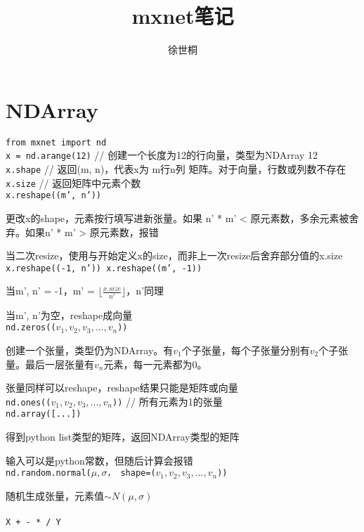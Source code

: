 \documentclass[UTF8]{ctexart}
\title{mxnet笔记}
\author{徐世桐}
\date{}
\begin{document}
\maketitle

\section{NDArray}

\noindent \texttt{from mxnet import nd}\\
\texttt{x = nd.arange(12)} // 创建一个长度为12的行向量，类型为NDArray 12\\
\texttt{x.shape} // 返回(m, n)，代表x为 m行n列 矩阵。对于向量，行数或列数不存在\\
\texttt{x.size} // 返回矩阵中元素个数\\
\texttt{x.reshape((m', n'))}

  更改x的shape，元素按行填写进新张量。如果 n' * m' < 原元素数，多余元素被舍弃。如果n' * m' > 原元素数，报错

  当二次resize，使用与开始定义x的size，而非上一次resize后舍弃部分值的x.size\\
\texttt{x.reshape((-1, n')) x.reshape((m', -1))}
 
  当m', n' = -1，m' = $\lfloor \frac{x.size}{n'}\rfloor $，n'同理

  当m', n'为空，reshape成向量\\
\texttt{nd.zeros(($v_1, v_2, v_3, ..., v_n$))}
  
  创建一个张量，类型仍为NDArray。有$v_1$个子张量，每个子张量分别有$v_2$个子张量。最后一层张量有$v_n$元素，每一元素都为0。
  
  张量同样可以reshape，reshape结果只能是矩阵或向量\\
\texttt{nd.ones(($v_1, v_2, v_3, ..., v_n$))} // 所有元素为1的张量\\
\texttt{nd.array([...])}
 
  得到python list类型的矩阵，返回NDArray类型的矩阵
  
  输入可以是python常数，但随后计算会报错\\
\texttt{nd.random.normal($\mu, \sigma$， shape=($v_1, v_2, v_3, ..., v_n$))}

  随机生成张量，元素值$\sim N(\mu, \sigma)$\\\\
\texttt{X + - * / Y}
\end{document}
